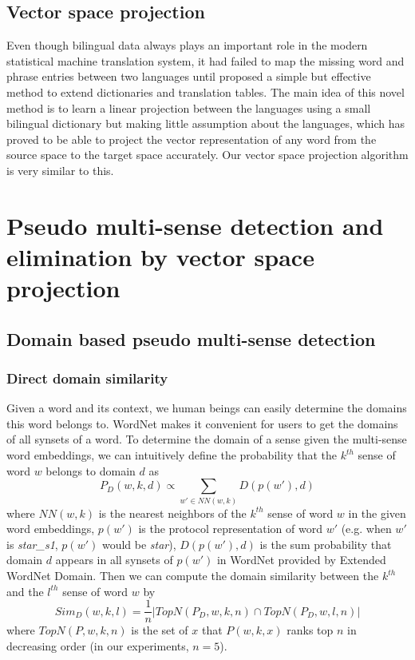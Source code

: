 \documentclass[11pt]{article}
\begin{document}
\subsection{Vector space projection}
Even though bilingual data always plays an important role in the modern statistical machine translation system, it had failed to map the missing word and phrase entries between two languages until  proposed a simple but effective method to extend dictionaries and translation tables. The main idea of this novel method is to learn a linear projection between the languages using a small bilingual dictionary but making little assumption about the languages, which has proved to be able to project the vector representation of any word from the source space to the target space accurately. Our vector space projection algorithm is very similar to this.
\section{Pseudo multi-sense detection and elimination by vector space projection}
\subsection{Domain based pseudo multi-sense detection}
\subsubsection{Direct domain similarity}
\par
Given a word and its context, we human beings can easily determine the domains this word belongs to. WordNet makes it convenient for users to get the domains of all synsets of a word. To determine the domain of a sense given the multi-sense word embeddings, we can intuitively define the probability that the $k^{th}$ sense of word $w$ belongs to domain $d$ as 
\begin{equation} \label{pdomain}
P_D(w, k, d) \propto  {\sum_{w' \in NN(w, k)} D(p(w'), d)}
\end{equation}
where $NN(w,k)$ is the nearest neighbors of the $k^{th}$ sense of word $w$ in the given word embeddings, $p(w')$ is the protocol representation of word $w'$ (e.g. when $w'$ is {\sl star\_s1}, $p(w')$ would be {\sl star}), $D(p(w'), d)$ is the sum probability that domain $d$ appears in all synsets of $p(w')$ in WordNet provided by Extended WordNet Domain. Then we can compute the domain similarity between the $k^{th}$ and the $l^{th}$ sense of word $w$ by
\begin{equation}
Sim_D(w,k,l) = \frac 1n|TopN(P_D,w,k,n) \cap TopN(P_D,w,l,n)| 
\end{equation}
where $TopN(P, w, k, n)$ is the set of $x$ that $P(w,k,x)$ ranks top $n$ in decreasing order (in our experiments, $n = 5$).
\end{document}
